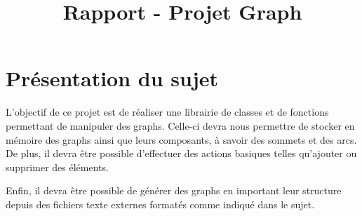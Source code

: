 
\title{Rapport - Projet Graph}
\fancyhf{}
\lhead{\leftmark}


	\maketitle
	\tableofcontents
	\chapter{Présentation du sujet}
		L'objectif de ce projet est de réaliser une librairie de classes et de fonctions permettant de manipuler des graphs. Celle-ci devra nous permettre de stocker en mémoire des graphs ainsi que leurs composants, à savoir des sommets et des arcs. De plus, il devra être possible d'effectuer des actions basiques telles qu'ajouter ou supprimer des éléments.
		
		Enfin, il devra être possible de générer des graphs en important leur structure depuis des fichiers texte externes formatés comme indiqué dans le sujet.
	
